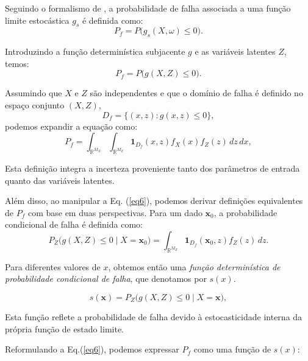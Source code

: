 Seguindo o formalismo de \cite{Choe2015}, a probabilidade de falha associada a uma 
função limite estocástica \(g_s\) é definida como:
\begin{equation}
P_f = P \bigl( g_s(X, \omega) \le 0 \bigr) .
\end{equation}

Introduzindo a função determinística subjacente \(g\) e as variáveis latentes \(Z\), temos:
\begin{equation}
P_f = P \bigl( g(X, Z) \le 0 \bigr).
\label{eq5}
\end{equation}

Assumindo que \(X\) e \(Z\) são independentes e que o domínio de falha é definido no 
espaço conjunto \((X,Z)\),
\[
D_f = \{(x, z) : g(x, z) \le 0 \},
\]
podemos expandir a equação como:
\begin{equation}
P_f =
\int_{\mathbb{R}^{M_X}} \int_{\mathbb{R}^{M_Z}} \mathbf{1}_{D_f}(x, z) f_X(x) f_Z(z) \, dz \, dx ,
\label{eq6}
\end{equation}


Esta definição integra a incerteza proveniente tanto dos parâmetros de entrada quanto das variáveis latentes.

Além disso, ao manipular a Eq. (\ref{eq6}), podemos derivar definições equivalentes de $P_f$ com base em duas perspectivas.  Para um dado \(\mathbf{x}_0\), a probabilidade condicional de falha é definida como:
\begin{equation}
P_Z \bigl( g(X, Z) \le 0 \mid X = \mathbf{x}_0 \bigr) =
\int_{\mathbb{R}^{M_Z}} \mathbf{1}_{D_f}(\mathbf{x}_0, z) f_Z(z) \, dz .
\end{equation}

 Para diferentes valores de \( x \), obtemos então uma \textit{função determinística de probabilidade condicional de falha}, que denotamos por \( s(x) \).

\begin{equation}
s(\mathbf{x}) = P_Z \bigl( g(X, Z) \le 0 \mid X = \mathbf{x} \bigr) ,
\label{eq8}
\end{equation}

Esta função reflete a probabilidade de falha devido à estocasticidade interna da própria função de estado limite.

Reformulando a Eq.(\ref{eq6}), podemos expressar \( P_f \) como uma função de \( s(x) \):

